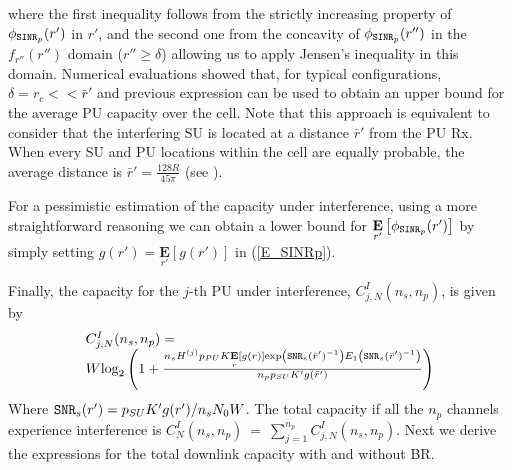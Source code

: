 where the first inequality follows from the strictly increasing property of $\phi_{\text{\ttfamily{SINR}}_{p}}(r')$ in $r'$, and the second one from the concavity of $\phi_{\text{\ttfamily{SINR}}_{p}}(r'')$ in the $f_{r''}(r'')$ domain ($r''\geq\delta$) allowing us to apply Jensen's inequality in this domain. Numerical evaluations showed that, for typical configurations, $\delta=r_{c}<<\bar{r}'$ and previous expression can be used to obtain an upper bound for the average PU capacity over the cell. Note that this approach is equivalent to consider that the interfering SU is located at a distance $\bar{r}'$ from the PU Rx. When every SU and PU locations within the cell are equally probable, the average distance is $\bar{r}' = \frac{128R}{45\pi}$ (see \cite{ref:Solomon}). 

For a pessimistic estimation of the capacity under interference, using a more straightforward reasoning we can obtain a lower bound for $\underset{r'}{\mathbf{E}}\left[\phi_{\text{\ttfamily{SINR}}_{p}}(r')\right]$ by simply setting $g(r')=\underset{r'}{\mathbf{E}}\left[g(r')\right]$ in (\ref{E_SINRp}).


Finally, the capacity for the $j$-th PU under interference, $C^{I}_{j,N}(n_{s},n_{p})$, is given by
\begin{equation}\label{CIjN}
\begin{array}{l}
C^{I}_{j,N}(n_{s},n_{p}) = \\
W\text{log}_{2}\left(1+
\frac{n_{s}H^{(j)}p_{PU}K\underset{r}{\mathbf{E}}\left[g(r)\right]\text{exp}\left(\text{\ttfamily{SNR}}_{s}(\bar{r}')^{-1}\right)E_{1}\left(\text{\ttfamily{SNR}}_{s}(\bar{r}')^{-1}\right)}
{n_{p}p_{SU}K'g(\bar{r}')}\right)
\end{array}
\end{equation}
Where $\text{\ttfamily{SNR}}_{s}(r') = p_{SU}K'g(r')/n_{s}N_{0}W$.
The total capacity if all the $n_{p}$ channels experience interference is $C^{I}_{N}(n_{s},n_{p})~=~\sum_{j=1}^{n_{p}}C^{I}_{j,N}(n_{s},n_{p})$.
Next we derive the expressions for the total downlink capacity with and without BR.


